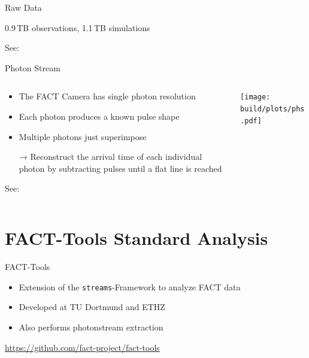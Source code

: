 \documentclass[compress, 9pt, aspectratio=1610, professionalfonts]{beamer}
\begin{document}
\begin{frame}[t]{Raw Data}
\begin{itemize}
      \vspace{0.2cm}
      \begin{center}
        \LARGE 0.9\,TB observations, 1.1\,TB simulations
      \end{center}
  \end{itemize}
    
  \begin{center}
    \small See: \cite{zfits}
  \end{center}
\end{frame}

\begin{frame}[c]{Photon Stream}
  \begin{columns}[onlytextwidth]
    \begin{column}{0.475\textwidth}
      \begin{itemize}
        \item The FACT Camera has single photon resolution
        \item Each photon produces a known pulse shape 
        \item Multiple photons just superimpose
        \item[→] Reconstruct the arrival time of each individual photon by subtracting pulses until a flat line is reached
      \end{itemize}
      \begin{center}
        \small See: \cite{photonstream}
      \end{center}
    \end{column}
    \begin{column}{0.475\textwidth}
      \texttt{[image: build/plots/phs.pdf]}
    \end{column}
  \end{columns}
\end{frame}

\section{FACT-Tools Standard Analysis}
\begin{frame}[t]{FACT-Tools}
  \begin{itemize}
    \item Extension of the \texttt{streams}-Framework to analyze FACT data
    \item Developed at TU Dortmund and ETHZ
    \item Also performs photonstream extraction
  \end{itemize}

  \vspace{0.25cm}
  \begin{center}
    \Large\url{https://github.com/fact-project/fact-tools}
  \end{center}

  \vspace{0.25cm}
  \begin{center}
    \begin{tikzpicture}[scale=1, transform shape]
      
    \end{tikzpicture}
  \end{center}
\end{frame}
\end{document}
